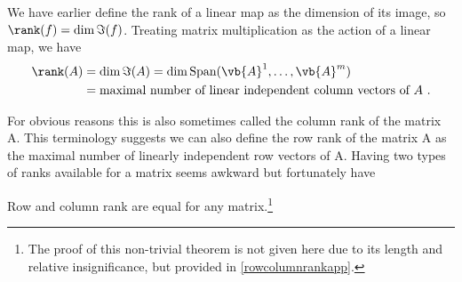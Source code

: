 \documentclass[a4paper,12pt]{report}
\begin{document}
We have earlier define the rank of a linear map as the dimension of its image, so \(\rank (f) = \dim \Im(f)\). Treating matrix multiplication as the action of a linear map, we have 
\begin{equation}
    \begin{aligned}
        \rank (A) &= \dim \Im(A) = \dim \text{Span} (\vb{A} ^{1}, \ldots ,\vb{A} ^{m}  ) \\
        &= \text{maximal number of linear independent column vectors of \(A\) }.
    \end{aligned}
\end{equation}

For obvious reasons this is also sometimes called the column rank of the matrix A. This terminology suggests we can also define the row rank of the matrix A as the maximal number of linearly independent row vectors of A. Having two types of ranks available for a matrix seems awkward but fortunately have

\begin{theorem}\label{rowcolumnrank} 
Row and column rank are equal for any matrix.\footnote{The proof of this non-trivial theorem is not given here due to its length and relative insignificance, but provided in \cref{rowcolumnrankapp}.}
\end{theorem}
\end{document}
